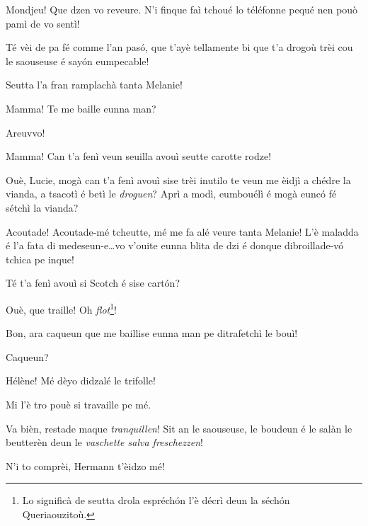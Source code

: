 \begin{drama}
\Luciespeaks Mondjeu! Que dzen vo reveure. N’i finque faì tchoué lo téléfonne pequé nen pouò pamì de vo sentì!


\Luciespeaks{} Té vèi de pa fé comme l'an pas\'o, que t'ayè tellamente bi que t'a drogoù trèi cou le saouseuse é say\'on eumpecable!

\Hermannspeaks{} Seutta l’a fran ramplachà tanta Melanie!

\Remyspeaks{} Mamma! Te me baille eunna man?

\Luciespeaks Areuvvo!

\Helenespeaks  Mamma! Can t'a fenì veun seuilla avouì seutte carotte rodze!

\Hermannspeaks{} Ouè, Lucie,  mogà can t’a fenì avouì sise trèi inutilo te veun me èidjì a chédre la vianda, a tsacotì é betì le \textit{droguen}? Aprì a modì, eumbouélì é mogà eunc\'o fé sétchì la vianda?

\Luciespeaks{} Acoutade! Acoutade-mé tcheutte, mé me fa alé veure tanta Melanie! L'è maladda é l'a fata di medeseun-e\ldots vo v'ouite eunna blita de dzi é donque  dibroillade-v\'o tchica pe inque!


\scene[-- Se comenche!]

\Hermannspeaks{} Té t'a fenì avouì si Scotch é sise cart\'on?

\Cesarspeaks Ouè, que traille! Oh \textit{flot}\footnote{ Lo significà de seutta drola espréch\'on l'è décrì deun la séch\'on Queriaouzitoù.}!

\Hermannspeaks Bon, ara caqueun que me baillise eunna man pe ditrafetchì le bouì!


\Hermannspeaks{} Caqueun?

\Remyspeaks  Hélène! Mé dèyo didzalé le trifolle! 

\Helenespeaks  Mi l'è tro pouè si travaille pe mé.

\Hermannspeaks{} Va bièn, restade maque \textit{tranquillen}! Sit an le saouseuse, le boudeun é le salàn le beutterèn deun le \textit{vaschette salva freschezzen}!

\Cesarspeaks N’i to comprèi, Hermann t'èidzo mé!


\end{drama}
